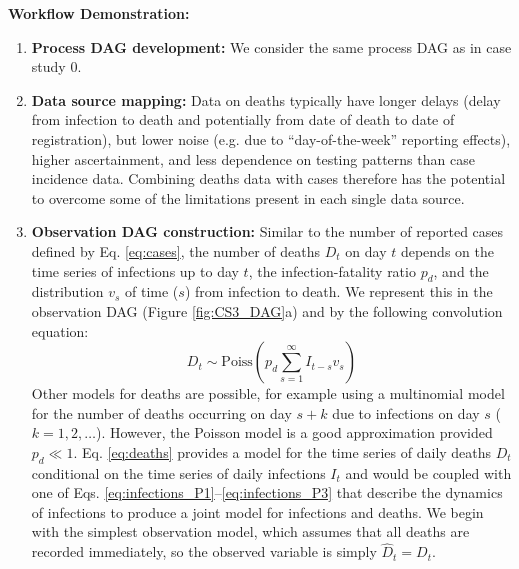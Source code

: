 \documentclass{article}
\begin{document}
\textbf{Workflow Demonstration:}
\begin{enumerate}
    \item \textbf{Process DAG development:} We consider the same process DAG as in case study 0.
        
    \item \textbf{Data source mapping:} Data on deaths typically have longer delays (delay from infection to death and potentially from date of death to date of registration), but lower noise (e.g. due to ``day-of-the-week'' reporting effects), higher ascertainment, and less dependence on testing patterns than case incidence data. Combining deaths data with cases therefore has the potential to overcome some of the limitations present in each single data source. 
    
    \item \textbf{Observation DAG construction:} Similar to the number of reported cases defined by Eq. \eqref{eq:cases}, the number of deaths $D_t$ on day $t$ depends on the time series of infections up to day $t$, the infection-fatality ratio $p_d$, and the distribution $v_s$ of time ($s$) from infection to death. We represent this in the observation DAG (Figure \ref{fig:CS3_DAG}a) and by the following convolution equation:
    \begin{equation} \label{eq:deaths}
        D_t \sim \mathrm{Poiss}\left(p_d \sum_{s=1}^\infty I_{t-s}v_s \right)
    \end{equation}
    Other models for deaths are possible, for example using a multinomial model for the number of deaths occurring on day $s+k$ due to infections on day $s$ ($k=1,2,\ldots$). However, the Poisson model is a good approximation provided $p_d\ll 1$. 
    Eq. \eqref{eq:deaths} provides a model for the time series of daily deaths $D_t$ conditional on the time series of daily infections $I_t$ and would be coupled with one of Eqs. \eqref{eq:infections_P1}--\eqref{eq:infections_P3} that describe the dynamics of infections to produce a joint model for infections and deaths. We begin with the simplest observation model, which assumes that all deaths are recorded immediately, so the observed variable is simply $\hat{D}_t=D_t$.
    



\end{enumerate}
\end{document}
